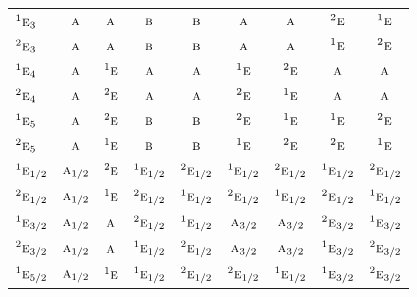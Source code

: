 \documentclass[10pt,a4paper]{article}
\numberwithin{equation}{section}
\newcommand{\irr}[1]{\text{\normalfont\scshape #1}}
\newcommand{\conjpair}[1]{{}^{#1}}
\begin{document}
{\begin{longtable}{@{}lcccccccc@{}}
$\conjpair{1}\irr{e}_{3}$ & $\irr{a}$ & $\irr{a}$ & $\irr{b}$ & $\irr{b}$ & $\irr{a}$ & $\irr{a}$ & $\conjpair{2}\irr{e}$ & $\conjpair{1}\irr{e}$\\
$\conjpair{2}\irr{e}_{3}$ & $\irr{a}$ & $\irr{a}$ & $\irr{b}$ & $\irr{b}$ & $\irr{a}$ & $\irr{a}$ & $\conjpair{1}\irr{e}$ & $\conjpair{2}\irr{e}$\\
$\conjpair{1}\irr{e}_{4}$ & $\irr{a}$ & $\conjpair{1}\irr{e}$ & $\irr{a}$ & $\irr{a}$ & $\conjpair{1}\irr{e}$ & $\conjpair{2}\irr{e}$ & $\irr{a}$ & $\irr{a}$\\
$\conjpair{2}\irr{e}_{4}$ & $\irr{a}$ & $\conjpair{2}\irr{e}$ & $\irr{a}$ & $\irr{a}$ & $\conjpair{2}\irr{e}$ & $\conjpair{1}\irr{e}$ & $\irr{a}$ & $\irr{a}$\\
$\conjpair{1}\irr{e}_{5}$ & $\irr{a}$ & $\conjpair{2}\irr{e}$ & $\irr{b}$ & $\irr{b}$ & $\conjpair{2}\irr{e}$ & $\conjpair{1}\irr{e}$ & $\conjpair{1}\irr{e}$ & $\conjpair{2}\irr{e}$\\
$\conjpair{2}\irr{e}_{5}$ & $\irr{a}$ & $\conjpair{1}\irr{e}$ & $\irr{b}$ & $\irr{b}$ & $\conjpair{1}\irr{e}$ & $\conjpair{2}\irr{e}$ & $\conjpair{2}\irr{e}$ & $\conjpair{1}\irr{e}$\\
$\conjpair{1}\irr{e}_{1/2}$ & $\irr{a}_{1/2}$ & $\conjpair{2}\irr{e}$ & $\conjpair{1}\irr{e}_{1/2}$ & $\conjpair{2}\irr{e}_{1/2}$ & $\conjpair{1}\irr{e}_{1/2}$ & $\conjpair{2}\irr{e}_{1/2}$ & $\conjpair{1}\irr{e}_{1/2}$ & $\conjpair{2}\irr{e}_{1/2}$\\
$\conjpair{2}\irr{e}_{1/2}$ & $\irr{a}_{1/2}$ & $\conjpair{1}\irr{e}$ & $\conjpair{2}\irr{e}_{1/2}$ & $\conjpair{1}\irr{e}_{1/2}$ & $\conjpair{2}\irr{e}_{1/2}$ & $\conjpair{1}\irr{e}_{1/2}$ & $\conjpair{2}\irr{e}_{1/2}$ & $\conjpair{1}\irr{e}_{1/2}$\\
$\conjpair{1}\irr{e}_{3/2}$ & $\irr{a}_{1/2}$ & $\irr{a}$ & $\conjpair{2}\irr{e}_{1/2}$ & $\conjpair{1}\irr{e}_{1/2}$ & $\irr{a}_{3/2}$ & $\irr{a}_{3/2}$ & $\conjpair{2}\irr{e}_{3/2}$ & $\conjpair{1}\irr{e}_{3/2}$\\
$\conjpair{2}\irr{e}_{3/2}$ & $\irr{a}_{1/2}$ & $\irr{a}$ & $\conjpair{1}\irr{e}_{1/2}$ & $\conjpair{2}\irr{e}_{1/2}$ & $\irr{a}_{3/2}$ & $\irr{a}_{3/2}$ & $\conjpair{1}\irr{e}_{3/2}$ & $\conjpair{2}\irr{e}_{3/2}$\\
$\conjpair{1}\irr{e}_{5/2}$ & $\irr{a}_{1/2}$ & $\conjpair{1}\irr{e}$ & $\conjpair{1}\irr{e}_{1/2}$ & $\conjpair{2}\irr{e}_{1/2}$ & $\conjpair{2}\irr{e}_{1/2}$ & $\conjpair{1}\irr{e}_{1/2}$ & $\conjpair{1}\irr{e}_{3/2}$ & $\conjpair{2}\irr{e}_{3/2}$\\

\end{longtable}}
\end{document}
